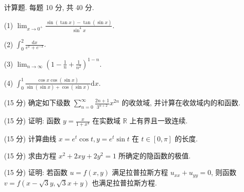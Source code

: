 \par{}
计算题. 每题 10 分, 共 40 分.\par
(1) $\lim_{x\to 0^{+}}\frac{\sin(\tan x) - \tan(\sin x)}{\sin^4 x}.$\par
(2) $\int_0^2\frac{\mathrm{d}x}{e^x + e^{-x}}.$\par
(3) $\lim_{n\to \infty}\left(1 - \frac{1}{n} +\frac{1}{n^2}\right)^{1 - n}.$\par
(4) $\int_0^1\frac{\cos x\cos(\sin x)}{\sin(\sin x) + \cos(\sin x)}\mathrm{d}x.$\par
\par{}
(15 分) 确定如下级数 $\sum_{n=0}^{\infty} \frac{2n+1}{3^{n+2}} x^{2n}$ 的收敛域, 并计算在收敛域内的和函数.\par
\par{}
(15 分) 证明: 函数 $y = \frac{x}{1 + x^4}$ 在实数域 $\mathbb{R}$ 上有界且一致连续.\par
\par{}
(15 分) 计算曲线 $x = e^{t} \cos t, y = e^{t} \sin t$ 在 $t \in [0, \pi]$ 的长度.\par
\par{}
(15 分) 求由方程 $x^{2} + 2xy + 2y^{2} = 1$ 所确定的隐函数的极值.\par
\par{}
(15 分) 证明: 若函数 $u = f(x, y)$ 满足拉普拉斯方程 $u_{xx} + u_{yy} = 0$, 则函数 $v = f(x - \sqrt{3}y, \sqrt{3}x + y)$ 也满足拉普拉斯方程.\par
\par{}
\par{}
